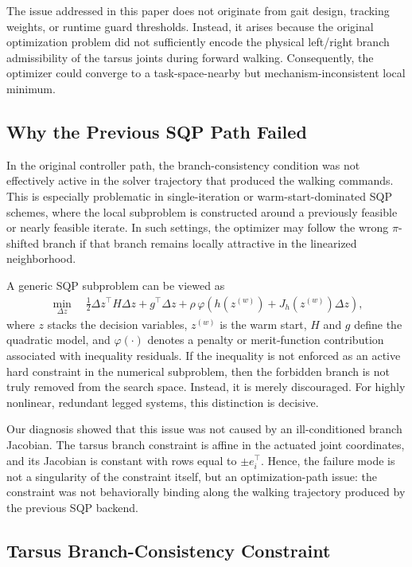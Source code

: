 The issue addressed in this paper does not originate from gait design, tracking weights, or runtime guard thresholds. Instead, it arises because the original optimization problem did not sufficiently encode the physical left/right branch admissibility of the tarsus joints during forward walking. Consequently, the optimizer could converge to a task-space-nearby but mechanism-inconsistent local minimum.

\subsection{Why the Previous SQP Path Failed}

In the original controller path, the branch-consistency condition was not effectively active in the solver trajectory that produced the walking commands. This is especially problematic in single-iteration or warm-start-dominated SQP schemes, where the local subproblem is constructed around a previously feasible or nearly feasible iterate. In such settings, the optimizer may follow the wrong $\pi$-shifted branch if that branch remains locally attractive in the linearized neighborhood.

A generic SQP subproblem can be viewed as
\begin{align}
\min_{\Delta z} \quad \frac{1}{2}\Delta z^\top H \Delta z + g^\top \Delta z + \rho\,\varphi\!\left(h(z^{(w)}) + J_h(z^{(w)})\Delta z\right),
\end{align}
where $z$ stacks the decision variables, $z^{(w)}$ is the warm start, $H$ and $g$ define the quadratic model, and $\varphi(\cdot)$ denotes a penalty or merit-function contribution associated with inequality residuals. If the inequality is not enforced as an active hard constraint in the numerical subproblem, then the forbidden branch is not truly removed from the search space. Instead, it is merely discouraged. For highly nonlinear, redundant legged systems, this distinction is decisive.

Our diagnosis showed that this issue was not caused by an ill-conditioned branch Jacobian. The tarsus branch constraint is affine in the actuated joint coordinates, and its Jacobian is constant with rows equal to $\pm e_i^\top$. Hence, the failure mode is not a singularity of the constraint itself, but an optimization-path issue: the constraint was not behaviorally binding along the walking trajectory produced by the previous SQP backend.

\subsection{Tarsus Branch-Consistency Constraint}

